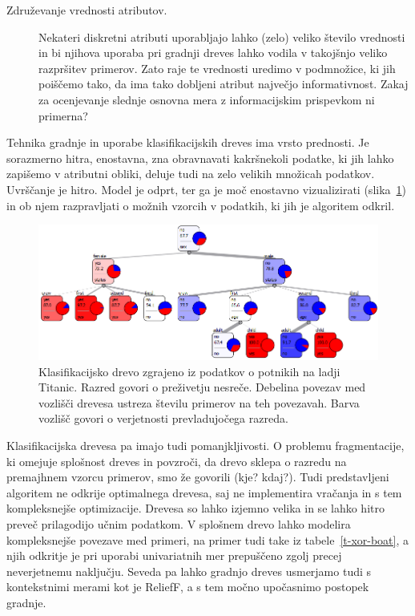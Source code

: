 \begin{description}
\item[Združevanje vrednosti atributov.] Nekateri diskretni atributi uporabljajo lahko (zelo) veliko število vrednosti in bi njihova uporaba pri gradnji dreves lahko vodila v takojšnjo veliko razpršitev primerov. Zato raje te vrednosti uredimo v podmnožice, ki jih poiščemo tako, da ima tako dobljeni atribut največjo informativnost. Zakaj za ocenjevanje slednje osnovna mera z informacijskim prispevkom ni primerna?
\end{description}

Tehnika gradnje in uporabe klasifikacijskih dreves ima vrsto prednosti. Je sorazmerno hitra, enostavna, zna obravnavati kakršnekoli podatke, ki jih lahko zapišemo v atributni obliki, deluje tudi na zelo velikih množicah podatkov. Uvrščanje je hitro. Model je odprt, ter ga je moč enostavno vizualizirati (slika~\ref{f-titanic-tree}) in ob njem razpravljati o možnih vzorcih v podatkih, ki jih je algoritem odkril.

\begin{figure}[htbp]
\begin{center}
\includegraphics[width=15cm]{slike/titanic-tree.png}
\caption{Klasifikacijsko drevo zgrajeno iz podatkov o potnikih na ladji Titanic. Razred govori o preživetju nesreče. Debelina povezav med vozlišči drevesa ustreza številu primerov na teh povezavah. Barva vozlišč govori o verjetnosti prevladujočega razreda.}
\label{f-titanic-tree}
\end{center}
\end{figure}

Klasifikacijska drevesa pa imajo tudi pomanjkljivosti. O problemu fragmentacije, ki omejuje splošnost dreves in povzroči, da drevo sklepa o razredu na premajhnem vzorcu primerov, smo že govorili (kje? kdaj?). Tudi predstavljeni algoritem ne odkrije optimalnega drevesa, saj ne implementira vračanja in s tem kompleksnejše optimizacije. Drevesa so lahko izjemno velika in se lahko hitro preveč prilagodijo učnim podatkom. V splošnem drevo lahko modelira kompleksnejše povezave med primeri, na primer tudi take iz tabele~\ref{t-xor-boat}, a njih odkritje je pri uporabi univariatnih mer prepuščeno zgolj precej neverjetnemu naključju. Seveda pa lahko gradnjo dreves usmerjamo tudi s kontekstnimi merami kot je ReliefF, a s tem močno upočasnimo postopek gradnje.


